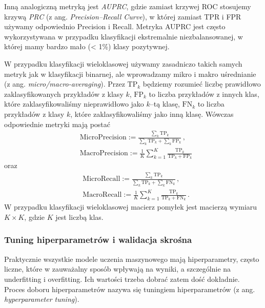 \documentclass{myclass}
\numberwithin{equation}{subsection}
\begin{document}
Inną analogiczną metryką jest \emph{AUPRC}, gdzie zamiast krzywej ROC stosujemy krzywą \emph{PRC} (z
ang. \textit{Precision--Recall Curve}), w której zamiast TPR i FPR używamy odpowiednio Precision i
Recall. Metryka AUPRC jest często wykorzystywana w przypadku klasyfikacji ekstremalnie
niezbalansowanej, w której mamy bardzo mało (< 1\%) klasy pozytywnej.

W przypadku klasyfikacji wieloklasowej używamy zasadniczo takich samych metryk jak w klasyfikacji
binarnej, ale wprowadzamy mikro i makro uśrednianie (z ang. \textit{micro/macro-averaging}). Przez
\(\mathrm{TP}_k\) będziemy rozumieć liczbę prawidłowo zaklasyfikowanych przykładów z klasy \(k\),
\(\mathrm{FP}_k\) to liczba przykładów z innych klas, które zaklasyfikowaliśmy nieprawidłowo jako
\(k\)--tą klasę, \(\mathrm{FN}_k\) to liczba przykładów z klasy \(k\), które zaklasyfikowaliśmy jako
inną klasę. Wówczas odpowiednie metryki mają postać
\begin{equation}
    \begin{split}
        &\mathrm{MicroPrecision} := \frac{\sum_{k} \mathrm{TP}_k}{\sum_{k} \mathrm{TP}_k + \sum_{k} \mathrm{FP}_k}\,,\\
        &\mathrm{MacroPrecision} := \frac{1}{K} \sum_{k=1}^K \frac{\mathrm{TP}_k}{\mathrm{TP}_k + \mathrm{FP}_k}
    \end{split}
\end{equation}
oraz
\begin{equation}
    \begin{split}
        &\mathrm{MicroRecall} := \frac{\sum_{k} \mathrm{TP}_k}{\sum_{k} \mathrm{TP}_k + \sum_{k} \mathrm{FN}_k}\,,\\
        &\mathrm{MacroRecall} := \frac{1}{K} \sum_{k=1}^K \frac{\mathrm{TP}_k}{\mathrm{TP}_k + \mathrm{FN}_k}\,.
    \end{split}
\end{equation}
W przypadku klasyfikacji wieloklasowej macierz pomyłek jest macierzą wymiaru \(K \times K\), gdzie
\(K\) jest liczbą klas.


\subsubsection{Tuning hiperparametrów i walidacja skrośna}

Praktycznie wszystkie modele uczenia maszynowego mają hiperparametry, często liczne, które w
zauważalny sposób wpływają na wyniki, a szczególnie na underfitting i overfitting. Ich wartości
trzeba dobrać zatem dość dokładnie. Proces doboru hiperparametrów nazywa się tuningiem
hiperparametrów (z ang. \textit{hyperparameter tuning}).
\end{document}
